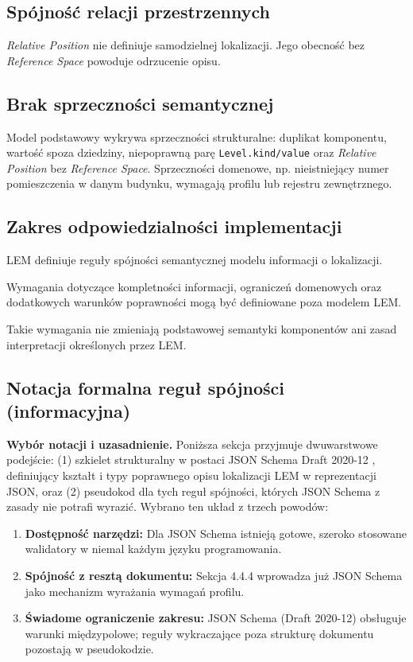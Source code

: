\subsection{Spójność relacji przestrzennych}
\label{sec:spojnosc-przestrzenna}
\textit{Relative Position} nie definiuje samodzielnej lokalizacji. Jego obecność bez \textit{Reference Space} powoduje odrzucenie opisu.

\subsection{Brak sprzeczności semantycznej}
\label{sec:brak-sprzecznosci}
Model podstawowy wykrywa sprzeczności strukturalne: duplikat komponentu, wartość spoza dziedziny, niepoprawną parę \texttt{Level.kind/value} oraz \textit{Relative Position} bez \textit{Reference Space}. Sprzeczności domenowe, np. nieistniejący numer pomieszczenia w danym budynku, wymagają profilu lub rejestru zewnętrznego.

\subsection{Zakres odpowiedzialności implementacji}
\label{sec:odpowiedzialnosc-impl}
LEM definiuje reguły spójności semantycznej modelu informacji o lokalizacji.

Wymagania dotyczące kompletności informacji, ograniczeń domenowych oraz dodatkowych warunków poprawności mogą być definiowane poza modelem LEM.

Takie wymagania nie zmieniają podstawowej semantyki komponentów ani zasad interpretacji określonych przez LEM.

\subsection{Notacja formalna reguł spójności (informacyjna)}
\label{sec:notacja-formalna}
\textbf{Wybór notacji i uzasadnienie.} Poniższa sekcja przyjmuje dwuwarstwowe podejście: (1) szkielet strukturalny w postaci JSON Schema Draft 2020-12 \cite{JSONSchema202012}, definiujący kształt i typy poprawnego opisu lokalizacji LEM w reprezentacji JSON, oraz (2) pseudokod dla tych reguł spójności, których JSON Schema z zasady nie potrafi wyrazić. Wybrano ten układ z trzech powodów:
\begin{enumerate}
    \item \textbf{Dostępność narzędzi:} Dla JSON Schema istnieją gotowe, szeroko stosowane walidatory w niemal każdym języku programowania.
    \item \textbf{Spójność z resztą dokumentu:} Sekcja 4.4.4 wprowadza już JSON Schema jako mechanizm wyrażania wymagań profilu.
    \item \textbf{Świadome ograniczenie zakresu:} JSON Schema (Draft 2020-12) obsługuje warunki międzypolowe; reguły wykraczające poza strukturę dokumentu pozostają w pseudokodzie.
\end{enumerate}

